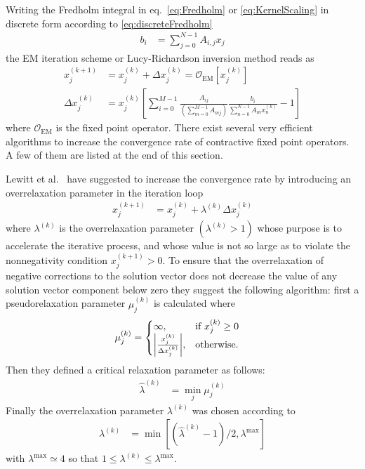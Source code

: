 Writing the Fredholm integral in eq.\ \ref{eq:Fredholm} or \ref{eq:KernelScaling} in discrete form according to \ref{eq:discreteFredholm}
\begin{align}
b_i &= \sum_{j=0}^{N-1} A_{i,j} x_j
\end{align}
the EM iteration scheme or Lucy\hyp{}Richardson inversion method reads as
\begin{align}\label{eq:LucyRichardsonInversionMethod}
  x_j^{(k+1)} &= x_j^{(k)} + \Delta x_j^{(k)} = \mathcal{O}_\mathrm{EM}\left[x_j^{(k)}\right]\\
  \Delta x_j^{(k)} &= x_j^{(k)}\left[\sum_{i=0}^{M-1}\frac{A_{ij}}{\left(\displaystyle \sum_{m=0}^{M-1}A_{mj}\right)}\frac{b_i}{\displaystyle \sum_{n=0}^{N-1}A_{in}x_n^{(k)}}-1\right]
\end{align}
where $\mathcal{O}_\mathrm{EM}$ is the fixed point operator. There exist several very efficient algorithms to increase the convergence rate of contractive fixed point operators. A few of them are listed at the end of this section.

 Lewitt et al.\ \cite{Lewitt1986} have suggested to increase the convergence rate by introducing an overrelaxation parameter in the iteration loop
\begin{align}\label{eq:OverRelaxation}
  x_j^{(k+1)} &= x_j^{(k)} + \lambda^{(k)}\Delta x_j^{(k)}
\end{align}
where $\lambda^{(k)}$ is the overrelaxation parameter $(\lambda^{(k)}> 1)$ whose
purpose is to accelerate the iterative process, and whose value is not so large as to violate the nonnegativity condition $x_j^{(k+1)} > 0$. To ensure that the overrelaxation of negative corrections to the solution vector does not decrease the value of any solution vector component below zero they suggest the following algorithm: first a pseudorelaxation parameter $\mu_j^{(k)}$ is calculated where
\begin{align}
\label{eq:pseudorelaxation}
  \mu_j^{(k)} &=
  \begin{cases}
    \infty, & \mbox{if } x_j^{(k)} \geq 0 \\
    \abs{\frac{x_j^{(k)}}{\Delta x_j^{(k)}}}, & \mbox{otherwise}.
  \end{cases}
\end{align}
Then they defined a critical relaxation parameter as follows:
\begin{align}\label{eq:criticalrelaxationparameter}
  \hat{\lambda}^{(k)} &= \min_j \mu_j^{(k)}
\end{align}
Finally the overrelaxation parameter $\lambda^{(k)}$ was chosen according to
\begin{align}\label{eq:useopverrelaxationparameter}
  \lambda^{(k)} &= \min \left[ \left(\hat{\lambda}^{(k)}-1\right)/2,\lambda^{\max}\right]
\end{align}
with $\lambda^{\max} \simeq 4$ so that $1\leq  \lambda^{(k)}\leq \lambda^{\max}$.

